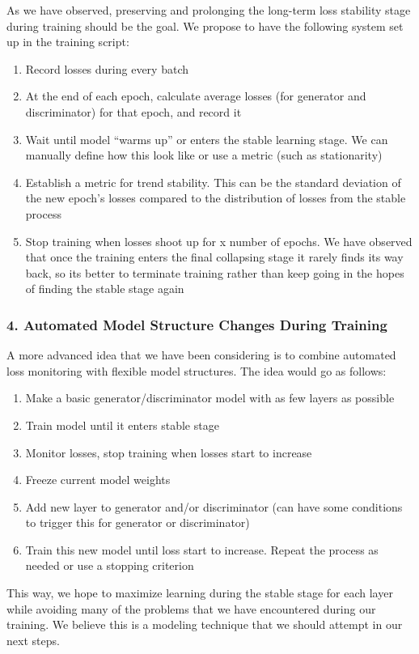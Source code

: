 \documentclass[12pt,oneside]{chicagocapstone}
\providecommand{\tightlist}{%
  \setlength{\itemsep}{0pt}\setlength{\parskip}{0pt}}
\begin{document}
As we have observed, preserving and prolonging the long-term loss stability stage during training should be the goal. We propose to have the following system set up in the training script:
\begin{enumerate}
\def\labelenumi{\arabic{enumi}.}
\tightlist
\item
  Record losses during every batch
\item
  At the end of each epoch, calculate average losses (for generator and discriminator) for that epoch, and record it
\item
  Wait until model ``warms up'' or enters the stable learning stage. We can manually define how this look like or use a metric (such as stationarity)
\item
  Establish a metric for trend stability. This can be the standard deviation of the new epoch's losses compared to the distribution of losses from the stable process
\item
  Stop training when losses shoot up for x number of epochs. We have observed that once the training enters the final collapsing stage it rarely finds its way back, so its better to terminate training rather than keep going in the hopes of finding the stable stage again
\end{enumerate}
\hypertarget{automated-model-structure-changes-during-training}{%
\subsubsection*{4. Automated Model Structure Changes During Training}\label{automated-model-structure-changes-during-training}}

A more advanced idea that we have been considering is to combine automated loss monitoring with flexible model structures. The idea would go as follows:
\begin{enumerate}
\def\labelenumi{\arabic{enumi}.}
\tightlist
\item
  Make a basic generator/discriminator model with as few layers as possible
\item
  Train model until it enters stable stage
\item
  Monitor losses, stop training when losses start to increase
\item
  Freeze current model weights
\item
  Add new layer to generator and/or discriminator (can have some conditions to trigger this for generator or discriminator)
\item
  Train this new model until loss start to increase. Repeat the process as needed or use a stopping criterion
\end{enumerate}
This way, we hope to maximize learning during the stable stage for each layer while avoiding many of the problems that we have encountered during our training. We believe this is a modeling technique that we should attempt in our next steps.
\end{document}
